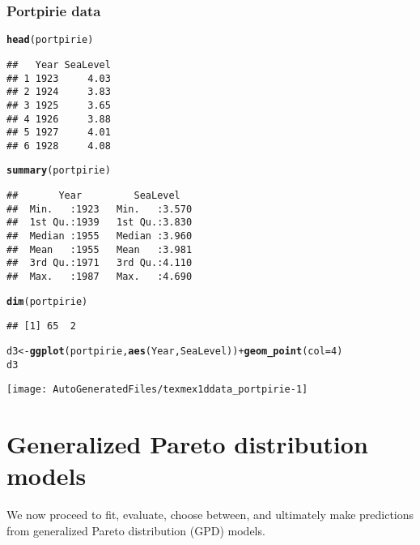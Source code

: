 \documentclass[10pt]{article}\usepackage[]{graphicx}\usepackage[]{color}
\makeatletter
\def\maxwidth{ %
  \ifdim\Gin@nat@width>\linewidth
    \linewidth
  \else
    \Gin@nat@width
  \fi
}
\newcommand{\hlnum}[1]{\textcolor[rgb]{0.686,0.059,0.569}{#1}}%
\newcommand{\hlopt}[1]{\textcolor[rgb]{0,0,0}{#1}}%
\newcommand{\hlstd}[1]{\textcolor[rgb]{0.345,0.345,0.345}{#1}}%
\newcommand{\hlkwb}[1]{\textcolor[rgb]{0.69,0.353,0.396}{#1}}%
\newcommand{\hlkwc}[1]{\textcolor[rgb]{0.333,0.667,0.333}{#1}}%
\newcommand{\hlkwd}[1]{\textcolor[rgb]{0.737,0.353,0.396}{\textbf{#1}}}%
\newenvironment{kframe}{%
 \def\at@end@of@kframe{}%
 \ifinner\ifhmode%
  \def\at@end@of@kframe{\end{minipage}}%
  \begin{minipage}{\columnwidth}%
 \fi\fi%
 \def\FrameCommand##1{\hskip\@totalleftmargin \hskip-\fboxsep
 \colorbox{shadecolor}{##1}\hskip-\fboxsep
     \hskip-\linewidth \hskip-\@totalleftmargin \hskip\columnwidth}%
 \MakeFramed {\advance\hsize-\width
   \@totalleftmargin\z@ \linewidth\hsize
   \@setminipage}}%
 {\par\unskip\endMakeFramed%
 \at@end@of@kframe}
\newenvironment{knitrout}{}{} %
\makeatother
\begin{document}
\subsubsection{Portpirie data}
\begin{knitrout}
\color{fgcolor}\begin{kframe}
\begin{alltt}
\hlkwd{head}\hlstd{(portpirie)}
\end{alltt}
\begin{verbatim}
##   Year SeaLevel
## 1 1923     4.03
## 2 1924     3.83
## 3 1925     3.65
## 4 1926     3.88
## 5 1927     4.01
## 6 1928     4.08
\end{verbatim}
\begin{alltt}
\hlkwd{summary}\hlstd{(portpirie)}
\end{alltt}
\begin{verbatim}
##       Year         SeaLevel    
##  Min.   :1923   Min.   :3.570  
##  1st Qu.:1939   1st Qu.:3.830  
##  Median :1955   Median :3.960  
##  Mean   :1955   Mean   :3.981  
##  3rd Qu.:1971   3rd Qu.:4.110  
##  Max.   :1987   Max.   :4.690
\end{verbatim}
\begin{alltt}
\hlkwd{dim}\hlstd{(portpirie)}
\end{alltt}
\begin{verbatim}
## [1] 65  2
\end{verbatim}
\begin{alltt}
\hlstd{d3} \hlkwb{<-} \hlkwd{ggplot}\hlstd{(portpirie,}\hlkwd{aes}\hlstd{(Year,SeaLevel))} \hlopt{+} \hlkwd{geom_point}\hlstd{(}\hlkwc{col}\hlstd{=}\hlnum{4}\hlstd{)}
\hlstd{d3}
\end{alltt}
\end{kframe}
\texttt{[image: AutoGeneratedFiles/texmex1ddata\_portpirie-1]} 

\end{knitrout}

%
\section{Generalized Pareto distribution models}
%
We now proceed to fit, evaluate, choose between, and ultimately
make predictions from generalized Pareto distribution (GPD) models.
%
\end{document}
